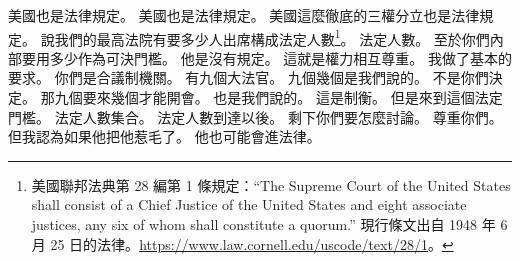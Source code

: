 \hypertarget{w01:cue:2160}{}美國也是法律規定。
\hypertarget{w01:cue:2161}{}美國也是法律規定。
\hypertarget{w01:cue:2162}{}美國這麼徹底的三權分立也是法律規定。
\hypertarget{w01:cue:2163}{}說我們的最高法院有要多少人出席構成法定人數\footnote{美國聯邦法典第 28 編第 1 條規定：“The Supreme Court of the United States shall consist of a Chief Justice of the United States and eight associate justices, any six of whom shall constitute a quorum.” 現行條文出自 1948 年 6 月 25 日的法律。\url{https://www.law.cornell.edu/uscode/text/28/1}。}。
\hypertarget{w01:cue:2164}{}法定人數。
\hypertarget{w01:cue:2165}{}至於你們內部要用多少作為可決門檻。
\hypertarget{w01:cue:2166}{}他是沒有規定。
\hypertarget{w01:cue:2167}{}這就是權力相互尊重。
\hypertarget{w01:cue:2168}{}我做了基本的要求。
\hypertarget{w01:cue:2169}{}你們是合議制機關。
\hypertarget{w01:cue:2170}{}有九個大法官。
\hypertarget{w01:cue:2171}{}九個幾個是我們說的。
\hypertarget{w01:cue:2172}{}不是你們決定。
\hypertarget{w01:cue:2173}{}那九個要來幾個才能開會。
\hypertarget{w01:cue:2174}{}也是我們說的。
\hypertarget{w01:cue:2175}{}這是制衡。
\hypertarget{w01:cue:2176}{}但是來到這個法定門檻。
\hypertarget{w01:cue:2177}{}法定人數集合。
\hypertarget{w01:cue:2178}{}法定人數到達以後。
\hypertarget{w01:cue:2179}{}剩下你們要怎麼討論。
\hypertarget{w01:cue:2180}{}尊重你們。
\hypertarget{w01:cue:2181}{}但我認為如果他把他惹毛了。
\hypertarget{w01:cue:2182}{}他也可能會進法律。

